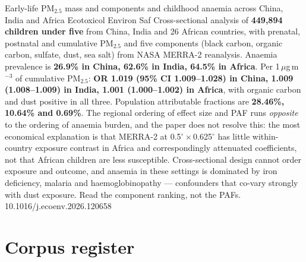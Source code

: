 \documentclass[10pt]{article}
\begin{document}

{Early-life PM$_{2.5}$ mass and components and childhood anaemia across China, India and Africa}
{Ecotoxicol Environ Saf}
{Cross-sectional analysis of \textbf{449{,}894 children under five} from China, India and 26
African countries, with prenatal, postnatal and cumulative PM$_{2.5}$ and five components
(black carbon, organic carbon, sulfate, dust, sea salt) from NASA MERRA-2 reanalysis.
Anaemia prevalence is \textbf{26.9\% in China, 62.6\% in India, 64.5\% in Africa}. Per
1\,$\mu$g\,m$^{-3}$ of cumulative PM$_{2.5}$: \textbf{OR 1.019 (95\% CI 1.009--1.028) in
China, 1.009 (1.008--1.009) in India, 1.001 (1.000--1.002) in Africa}, with organic carbon
and dust positive in all three. Population attributable fractions are \textbf{28.46\%,
10.64\% and 0.69\%}. The regional ordering of effect size and PAF runs \emph{opposite} to
the ordering of anaemia burden, and the paper does not resolve this: the most economical
explanation is that MERRA-2 at 0.5$^\circ\times$0.625$^\circ$ has little within-country
exposure contrast in Africa and correspondingly attenuated coefficients, not that African
children are less susceptible. Cross-sectional design cannot order exposure and outcome,
and anaemia in these settings is dominated by iron deficiency, malaria and haemoglobinopathy
--- confounders that co-vary strongly with dust exposure. Read the component ranking, not
the PAFs.}
{10.1016/j.ecoenv.2026.120658}

\clearpage

\section*{\sffamily\bfseries\color{Deep}Corpus register}
\vspace{-1.5mm}{\color{Amber}\rule{\linewidth}{1.1pt}}\vspace{2.5mm}


\end{document}
